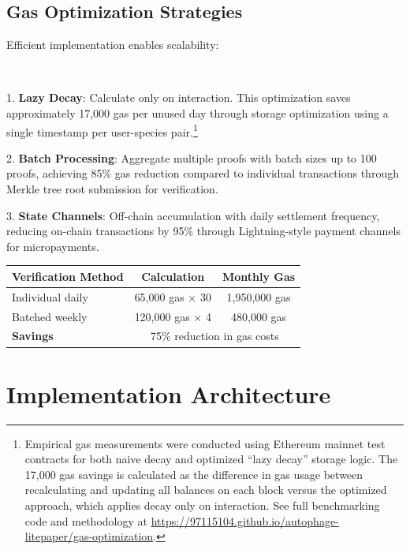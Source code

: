 \documentclass[11pt,letterpaper]{article}
\begin{document}
\subsection{Gas Optimization Strategies}

Efficient implementation enables scalability:

~

1. \textbf{Lazy Decay}: Calculate only on interaction. This optimization saves approximately 17,000 gas per unused day through storage optimization using a single timestamp per user-species pair.\footnote{
Empirical gas measurements were conducted using Ethereum mainnet test contracts for both naive decay and optimized “lazy decay” storage logic. The 17,000 gas savings is calculated as the difference in gas usage between recalculating and updating all balances on each block versus the optimized approach, which applies decay only on interaction. See full benchmarking code and methodology at \url{https://97115104.github.io/autophage-litepaper/gas-optimization}.
}

2. \textbf{Batch Processing}: Aggregate multiple proofs with batch sizes up to 100 proofs, achieving 85\% gas reduction compared to individual transactions through Merkle tree root submission for verification.

3. \textbf{State Channels}: Off-chain accumulation with daily settlement frequency, reducing on-chain transactions by 95\% through Lightning-style payment channels for micropayments.


\begin{table}[H]
\centering
\begin{tabular}{lcc}
\toprule
\textbf{Verification Method} & \textbf{Calculation} & \textbf{Monthly Gas} \\
\midrule
Individual daily & 65,000 gas × 30 & 1,950,000 gas \\
Batched weekly & 120,000 gas × 4 & 480,000 gas \\
\midrule
\textbf{Savings} & \multicolumn{2}{c}{75\% reduction in gas costs} \\
\bottomrule
\end{tabular}
\end{table}


\section{Implementation Architecture}
\end{document}

